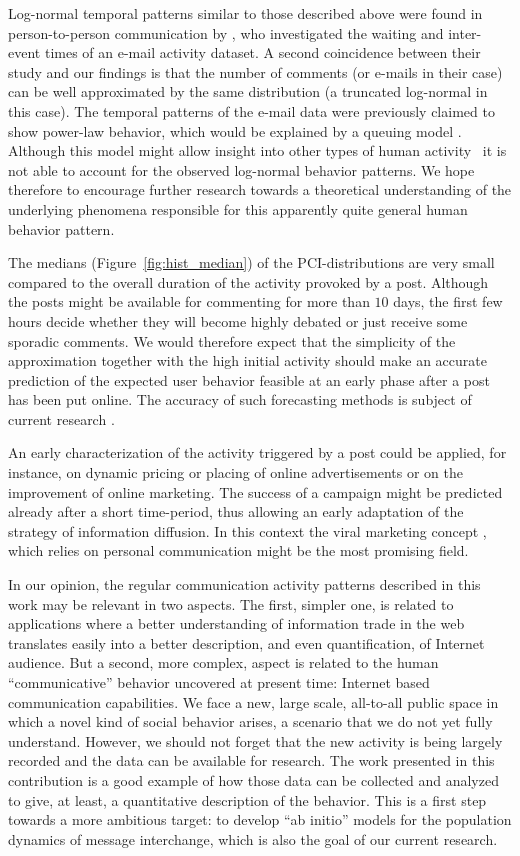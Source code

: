 \documentclass[twoside,11pt]{article}
\begin{document}
Log-normal temporal patterns similar to those described above were
found in person-to-person communication by \citet{Stouffer06},
who investigated the waiting and inter-event
times of an e-mail activity dataset. A second coincidence between
their study and our findings is that the number of comments (or
e-mails in their case) can be well approximated by the same
distribution (a truncated log-normal in this case).  The temporal
patterns of the e-mail data were previously claimed to show power-law
behavior, which would be explained by a queuing model
\citep{barabasi05}.  Although this model might allow insight into other
types of human activity~\citep{Vazquez06} it is not able to account for
the observed log-normal behavior patterns. We hope therefore to
encourage further research towards a theoretical understanding of the
underlying phenomena responsible for this apparently quite general
human behavior pattern.

The medians (Figure~\ref{fig:hist_median}) of the PCI-distributions
are very small compared to the overall duration of the activity
provoked by a post.  Although the posts might be available for
commenting for more than $10$ days, the first few hours decide whether
they will become highly debated or just receive some sporadic
comments.  We would therefore expect that the simplicity of the
approximation together with the high initial activity should make an
accurate prediction of the expected user behavior feasible at an early
phase after a post has been put online.  The accuracy of such
forecasting methods is subject of current research
\citep{kaltenbrunner_LAWEB2007}.

An early characterization of the activity triggered by a post could be
applied, for instance, on dynamic pricing or placing of online
advertisements or on the improvement of online marketing. The success
of a campaign might be predicted already after a short time-period,
thus allowing an early adaptation of the strategy of information
diffusion. In this context the viral marketing concept
\citep{Leskovec06}, which relies on personal communication might be the
most promising field.

In our opinion, the regular communication activity patterns described
in this work may be relevant in two aspects. The first, simpler one,
is related to applications where a better understanding of information
trade in the web translates easily into a better description, and even
quantification, of Internet audience.  But a second, more complex,
aspect is related to the human ``communicative'' behavior uncovered at
present time: Internet based communication capabilities. We face a
new, large scale, all-to-all public space in which a novel kind of
social behavior arises, a scenario that we do not yet fully
understand. However, we should not forget that the new activity is
being largely recorded and the data can be available for research.
The work presented in this contribution is a good example of how those
data can be collected and analyzed to give, at least, a quantitative
description of the behavior.  This is a first step towards a more
ambitious target: to develop ``ab initio'' models for the population
dynamics of message interchange, which is also the goal of our current
research.
\end{document}
